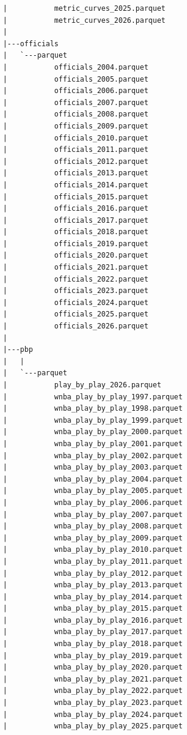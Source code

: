 \begin{lstlisting}
      |           metric_curves_2025.parquet
      |           metric_curves_2026.parquet
      |
      |---officials
      |   `---parquet
      |           officials_2004.parquet
      |           officials_2005.parquet
      |           officials_2006.parquet
      |           officials_2007.parquet
      |           officials_2008.parquet
      |           officials_2009.parquet
      |           officials_2010.parquet
      |           officials_2011.parquet
      |           officials_2012.parquet
      |           officials_2013.parquet
      |           officials_2014.parquet
      |           officials_2015.parquet
      |           officials_2016.parquet
      |           officials_2017.parquet
      |           officials_2018.parquet
      |           officials_2019.parquet
      |           officials_2020.parquet
      |           officials_2021.parquet
      |           officials_2022.parquet
      |           officials_2023.parquet
      |           officials_2024.parquet
      |           officials_2025.parquet
      |           officials_2026.parquet
      |
      |---pbp
      |   |
      |   `---parquet
      |           play_by_play_2026.parquet
      |           wnba_play_by_play_1997.parquet
      |           wnba_play_by_play_1998.parquet
      |           wnba_play_by_play_1999.parquet
      |           wnba_play_by_play_2000.parquet
      |           wnba_play_by_play_2001.parquet
      |           wnba_play_by_play_2002.parquet
      |           wnba_play_by_play_2003.parquet
      |           wnba_play_by_play_2004.parquet
      |           wnba_play_by_play_2005.parquet
      |           wnba_play_by_play_2006.parquet
      |           wnba_play_by_play_2007.parquet
      |           wnba_play_by_play_2008.parquet
      |           wnba_play_by_play_2009.parquet
      |           wnba_play_by_play_2010.parquet
      |           wnba_play_by_play_2011.parquet
      |           wnba_play_by_play_2012.parquet
      |           wnba_play_by_play_2013.parquet
      |           wnba_play_by_play_2014.parquet
      |           wnba_play_by_play_2015.parquet
      |           wnba_play_by_play_2016.parquet
      |           wnba_play_by_play_2017.parquet
      |           wnba_play_by_play_2018.parquet
      |           wnba_play_by_play_2019.parquet
      |           wnba_play_by_play_2020.parquet
      |           wnba_play_by_play_2021.parquet
      |           wnba_play_by_play_2022.parquet
      |           wnba_play_by_play_2023.parquet
      |           wnba_play_by_play_2024.parquet
      |           wnba_play_by_play_2025.parquet

\end{lstlisting}
